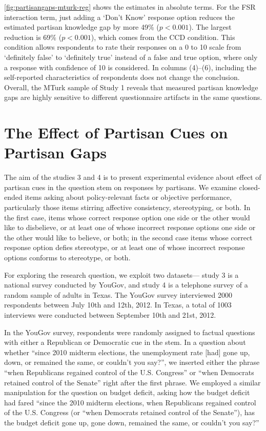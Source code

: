 \documentclass[12pt, letterpaper]{article}
\begin{document}
\cref{fig:partisangaps-mturk-reg} shows the estimates in absolute terms. For the FSR interaction term, just adding a `Don't Know' response option reduces the estimated partisan knowledge gap by more 49\% ($p<0.001$).
The largest reduction is 69\% ($p<0.001$), which comes from the CCD condition. This condition allows respondents to rate their responses on a 0 to 10 scale from `definitely false' to `definitely true' instead of a false and true option, where only a response with confidence of 10 is considered. In columns (4)--(6), including the self-reported characteristics of respondents does not change the conclusion. Overall, the MTurk sample of Study 1 reveals that measured partisan knowledge gaps are highly sensitive to different questionnaire artifacts in the same questions.

\newpage

\section*{The Effect of Partisan Cues on Partisan Gaps}\label{subsec:partisan-cues}
The aim of the studies 3 and 4 is to present experimental evidence about effect of partisan cues in the question stem on responses by partisans. We examine closed-ended items asking about policy-relevant facts or objective performance, particularly those items stirring affective consistency, stereotyping, or both.  In the first case, items whose correct response option one side or the other would like to disbelieve, or at least one of whose incorrect response options one side or the other would like to believe, or both; in the second case items whose correct response option defies stereotype, or at least one of whose incorrect response options conforms to stereotype, or both.

For exploring the research question, we exploit two datasets--- study 3 is a national survey conducted by YouGov, and study 4 is a telephone survey of a random sample of adults in Texas. The YouGov survey interviewed 2000 respondents between July 10th and 12th, 2012.  In Texas, a total of 1003 interviews were conducted between September 10th and 21st, 2012.

In the YouGov survey, respondents were randomly assigned to factual questions with either a Republican or Democratic cue in the stem. In a question about whether ``since 2010 midterm elections, the unemployment rate [had] gone up, down, or remained the same, or couldn't you say?'', we inserted either the phrase “when Republicans regained control of the U.S. Congress'' or ``when Democrats retained control of the Senate” right after the first phrase. We employed a similar manipulation for the question on budget deficit, asking how the budget deficit had fared “since the 2010 midterm elections, when Republicans regained control of the U.S. Congress (or ``when Democrats retained control of the Senate''), has the budget deficit gone up, gone down, remained the same, or couldn't you say?''
\end{document}
